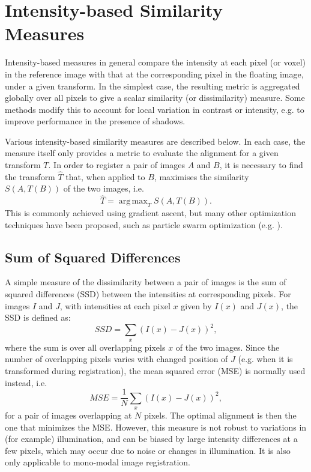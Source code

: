 \documentclass{report}
\DeclareMathOperator*{\argmax}{arg\,max}
\begin{document}
\section{Intensity-based Similarity Measures}
Intensity-based measures in general compare the intensity at each pixel (or voxel) in the reference image with that at the corresponding pixel in the floating image, under a given transform. In the simplest case, the resulting metric is aggregated globally over all pixels to give a scalar similarity (or dissimilarity) measure. Some methods modify this to account for local variation in contrast or intensity, e.g. to improve performance in the presence of shadows.

Various intensity-based similarity measures are described below. In each case, the measure itself only provides a metric to evaluate the alignment for a given transform $T$. In order to register a pair of images $A$ and $B$, it is necessary to find the transform $\hat{T}$ that, when applied to $B$, maximises the similarity $S(A, T(B))$ of the two images, i.e. 
\[
\hat{T}=\argmax_T S(A,T(B)).
\]
This is commonly achieved using gradient ascent, but many other optimization techniques have been proposed, such as particle swarm optimization (e.g. \cite{wachowiak2004approach}).

\subsection{Sum of Squared Differences}
A simple measure of the dissimilarity between a pair of images is the sum of squared differences (SSD) between the intensities at corresponding pixels. For images $I$ and $J$, with intensities at each pixel $x$ given by $I(x)$ and $J(x)$, the SSD is defined as:
\[
SSD = \sum_{x} (I(x)-J(x))^2,
\]
where the sum is over all overlapping pixels $x$ of the two images. Since the number of overlapping pixels varies with changed position of $J$ (e.g. when it is transformed during registration), the mean squared error (MSE) is normally used instead, i.e.
\[
MSE = \frac{1}{N}\sum_{x} (I(x)-J(x))^2,
\]
for a pair of images overlapping at $N$ pixels. The optimal alignment is then the one that minimizes the MSE. However, this measure is not robust to variations in (for example) illumination, and can be biased by large intensity differences at a few pixels, which may occur due to noise or changes in illumination. It is also only applicable to mono-modal image registration.
\end{document}
